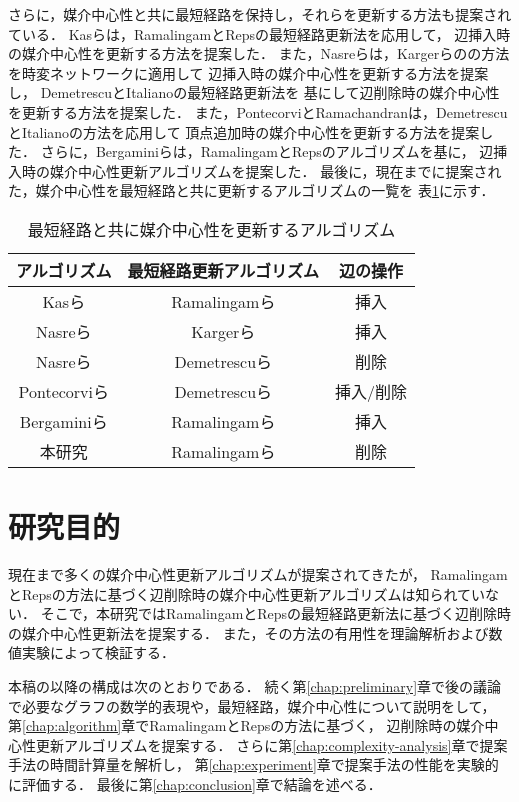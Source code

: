 さらに，媒介中心性と共に最短経路を保持し，それらを更新する方法も提案されている．
Kasらは，RamalingamとRepsの最短経路更新法\cite{Ramalingam1996}を応用して，
辺挿入時の媒介中心性を更新する方法を提案した\cite{Kas2013}．
また，Nasreらは，Kargerらの\cite{Karger1993}の方法を時変ネットワークに適用して
辺挿入時の媒介中心性を更新する方法を提案し\cite{Nasre2014a}，
DemetrescuとItalianoの最短経路更新法\cite{Demetrescu2003}を
基にして辺削除時の媒介中心性を更新する方法を提案した\cite{Nasre2014b}．
また，PontecorviとRamachandranは，DemetrescuとItalianoの方法を応用して
頂点追加時の媒介中心性を更新する方法を提案した\cite{Pontecorvi2015}．
さらに，Bergaminiらは，RamalingamとRepsのアルゴリズムを基に，
辺挿入時の媒介中心性更新アルゴリズムを提案した\cite{Bergamini2017}．
最後に，現在までに提案された，媒介中心性を最短経路と共に更新するアルゴリズムの一覧を
表\ref{tab:comparison-of-algorithms}に示す．

\begin{table}[tb]
  \centering
  \caption{最短経路と共に媒介中心性を更新するアルゴリズム}
  \label{tab:comparison-of-algorithms}
  \begin{tabular}{ccc}
    \hline
    アルゴリズム & 最短経路更新アルゴリズム & 辺の操作 \\ \hline
    Kasら\cite{Kas2013} & Ramalingamら\cite{Ramalingam1996} & 挿入 \\ \hline
    Nasreら\cite{Nasre2014a} & Kargerら\cite{Karger1993} & 挿入 \\ \hline
    Nasreら\cite{Nasre2014b} & Demetrescuら\cite{Demetrescu2003} & 削除 \\ \hline
    Pontecorviら\cite{Pontecorvi2015} & Demetrescuら\cite{Demetrescu2003} & 挿入/削除 \\ \hline
    Bergaminiら\cite{Bergamini2017} & Ramalingamら\cite{Ramalingam1996} & 挿入 \\ \hline
    本研究 & Ramalingamら\cite{Ramalingam1996} & 削除 \\ \hline
  \end{tabular}
\end{table}

\section{研究目的}

現在まで多くの媒介中心性更新アルゴリズムが提案されてきたが，
RamalingamとRepsの方法に基づく辺削除時の媒介中心性更新アルゴリズムは知られていない．
そこで，本研究ではRamalingamとRepsの最短経路更新法に基づく辺削除時の媒介中心性更新法を提案する．
また，その方法の有用性を理論解析および数値実験によって検証する．

本稿の以降の構成は次のとおりである．
続く第\ref{chap:preliminary}章で後の議論で必要なグラフの数学的表現や，最短経路，媒介中心性について説明をして，
第\ref{chap:algorithm}章でRamalingamとRepsの方法に基づく，
辺削除時の媒介中心性更新アルゴリズムを提案する．
さらに第\ref{chap:complexity-analysis}章で提案手法の時間計算量を解析し，
第\ref{chap:experiment}章で提案手法の性能を実験的に評価する．
最後に第\ref{chap:conclusion}章で結論を述べる．
